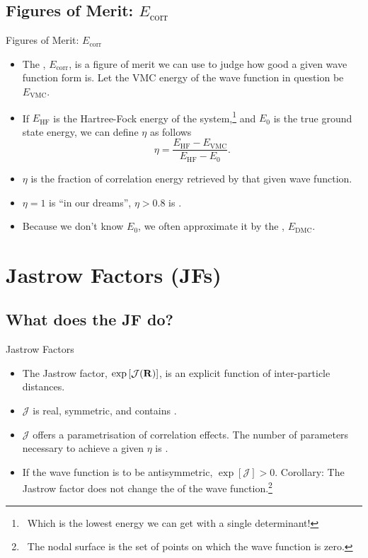 \documentclass[12pt, pdf, hyperref={draft}, usenames, dvipsnames,
aspectratio=169]{beamer}
\newcommand{\blue}[1]{{\bf\color{NavyBlue}{#1}}}
\newcommand{\green}[1]{{\bf\color{ForestGreen}{#1}}}
\begin{document}
\subsection{Figures of Merit: $E_{\text{corr}}$}\label{sub:figures_of_merit}

\begin{frame}{Figures of Merit: $E_{\text{corr}}$}
\begin{itemize}
  \item The \blue{correlation energy}, $E_{\text{corr}}$, is a figure of merit
  we can use to judge how good a given wave function form is. Let the VMC
  energy of the wave function in question be $E_{\text{VMC}}$.
  \item If $E_{\text{HF}}$ is the Hartree-Fock energy of the system,\footnote{\
  Which is the lowest energy we can get with a single determinant!} and $E_0$
  is the true ground state energy, we can define $\eta$ as follows
  \begin{equation}
    \eta = \dfrac{E_{\text{HF}} - E_{\text{VMC}}}{E_{\text{HF}} - E_{0}}.
  \end{equation}
  \item $\eta$ is the fraction of correlation energy retrieved by that given
  wave function.
  \item $\eta = 1$ is ``in our dreams'', $\eta>0.8$ is \green{reasonable}.
  \item Because we don't know $E_0$, we often
  approximate it by the \blue{fixed-node DMC energy}, $E_{\text{DMC}}$.
\end{itemize}
\end{frame}


\section{Jastrow Factors (JFs)}\label{sec:jastrow_factors}
\subsection{What does the JF do?}\label{sub:what_does_j_do}

\begin{frame}{Jastrow Factors}
\begin{itemize}
  \item The Jastrow factor, $\exp{\left[ \mathcal{J}({\bf R}) \right]}$, is an
  explicit function of inter-particle distances.
  \item $\mathcal{J}$ is real, symmetric, and contains \green{optimisable
  parameters}.
  \item $\mathcal{J}$ offers a \blue{compact} parametrisation of correlation effects. The
  number of parameters necessary to achieve a given $\eta$ is \green{system-size
  independent}.
  \item If the wave function is to be antisymmetric, $\exp{\left[
  \mathcal{J} \right]} > 0$. Corollary: The Jastrow factor does not change the
  \blue{nodal surface} of the wave function.\footnote{\ The nodal surface is the
  set of points on which the wave function is zero.}
\end{itemize}
\end{frame}
\end{document}
